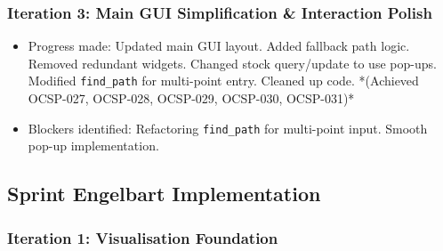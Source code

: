 \subsubsection{Iteration 3: Main GUI Simplification \& Interaction Polish}
\begin{itemize}
	\item Progress made: Updated main GUI layout. Added fallback path logic. Removed redundant widgets. Changed stock query/update to use pop-ups. Modified \verb|find_path| for multi-point entry. Cleaned up code. *(Achieved OCSP-027, OCSP-028, OCSP-029, OCSP-030, OCSP-031)*
	\item Blockers identified: Refactoring \verb|find_path| for multi-point input. Smooth pop-up implementation.
\end{itemize}


\subsection{Sprint Engelbart Implementation}

\subsubsection{Iteration 1: Visualisation Foundation}

